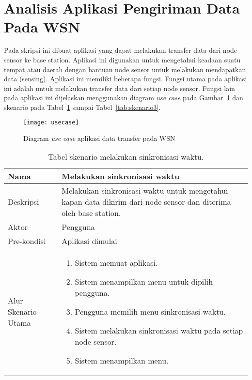 \section{Analisis Aplikasi Pengiriman Data Pada WSN}
Pada skripsi ini dibuat aplikasi yang dapat melakukan transfer data dari node sensor ke base station. Aplikasi ini digunakan untuk mengetahui keadaan suatu tempat atau daerah dengan bantuan node sensor untuk melakukan mendapatkan data (sensing). Aplikasi ini memiliki beberapa fungsi. Fungsi utama pada aplikasi ini adalah untuk melakukan transfer data dari setiap node sensor. Fungsi lain pada aplikasi ini dijelaskan menggunakan diagram \textit{use case} pada Gambar~\ref{fig:usecase} dan skenario pada Tabel~\ref{tab:skenario1} sampai Tabel~\ref{tab:skenario3}.

\begin{figure}[htbp]
	\centering
	\texttt{[image: usecase]}
	\caption{Diagram \textit{use case} aplikasi data transfer pada WSN}
	\label{fig:usecase}
\end{figure}

\begin{table}[htbp]
    \centering
    \begin{tabular}{|p{3cm}|p{10cm}|}
    \hline
        Nama & Melakukan sinkronisasi waktu\\
    \hline
    \hline
        Deskripsi & Melakukan sinkronisasi waktu untuk mengetahui kapan data dikirim dari node sensor dan diterima oleh base station. \\
    \hline
        Aktor & Pengguna \\
    \hline
        Pre-kondisi & Aplikasi dimulai \\
    \hline
        Alur Skenario Utama & 
        \begin{enumerate}
            \item Sistem memuat aplikasi.
            \item Sistem menampilkan menu untuk dipilih pengguna.
            \item Pengguna memilih menu sinkronisasi waktu.
            \item Sistem melakukan sinkronisasi waktu pada setiap node sensor.
            \item Sistem menampilkan menu.
        \end{enumerate}\\
    \hline
    \end{tabular}
    \caption{Tabel skenario melakukan sinkronisasi waktu.}
    \label{tab:skenario1}
\end{table}

